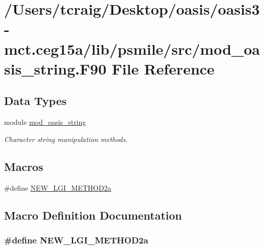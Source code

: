 \hypertarget{mod__oasis__string_8_f90}{\section{/\+Users/tcraig/\+Desktop/oasis/oasis3-\/mct.ceg15a/lib/psmile/src/mod\+\_\+oasis\+\_\+string.F90 File Reference}
\label{mod__oasis__string_8_f90}
}
\subsection*{Data Types}
\begin{DoxyCompactItemize}
\item 
module \hyperlink{classmod__oasis__string}{mod\+\_\+oasis\+\_\+string}
\begin{DoxyCompactList}\small\item\em Character string manipulation methods. \end{DoxyCompactList}\end{DoxyCompactItemize}
\subsection*{Macros}
\begin{DoxyCompactItemize}
\item 
\#define \hyperlink{mod__oasis__string_8_f90_a732dc6b61280242f5cf9c6b817dfd452}{N\+E\+W\+\_\+\+L\+G\+I\+\_\+\+M\+E\+T\+H\+O\+D2a}
\end{DoxyCompactItemize}


\subsection{Macro Definition Documentation}
\hypertarget{mod__oasis__string_8_f90_a732dc6b61280242f5cf9c6b817dfd452}{
\subsubsection[{N\+E\+W\+\_\+\+L\+G\+I\+\_\+\+M\+E\+T\+H\+O\+D2a}]{\setlength{\rightskip}{0pt plus 5cm}\#define N\+E\+W\+\_\+\+L\+G\+I\+\_\+\+M\+E\+T\+H\+O\+D2a}}\label{mod__oasis__string_8_f90_a732dc6b61280242f5cf9c6b817dfd452}
